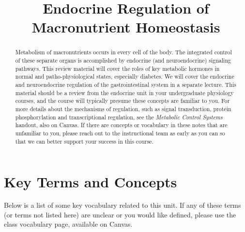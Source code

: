 \documentclass{tufte-handout}
\title{Endocrine Regulation of Macronutrient Homeostasis}
\author{}
\date{}  %
\begin{document}
\maketitle%

\begin{abstract}
\noindent Metabolism of macronutrients occurs in every cell of the body.  The integrated control of these separate organs is accomplished by endocrine (and neuroendocrine) signaling pathways.  This review material will cover the roles of  key metabolic hormones in normal and patho-physiological states, especially diabetes.  We will cover the endocrine and neuroendocrine regulation of the gastrointestinal system in a separate lecture.  This material should be a review from the endocrine unit in your undergraduate physiology courses, and the course will typically presume these concepts are familiar to you.  For more details about the mechanisms of regulation, such as signal transduction, protein phosphorylation and transcriptional regulation, see the \emph{Metabolic Control Systems} handout, also on Canvas.  If there are concepts or vocabulary in these notes that are unfamiliar to you, please reach out to the instructional team as early as you can so that we can better support your success in this course.
\end{abstract}

\tableofcontents


\pagebreak

\section{Key Terms and Concepts}

Below is a list of some key vocabulary related to this unit.  If any of these terms (or terms not listed here) are unclear or you would like defined, please use the class vocabulary page, available on Canvas.
\end{document}
